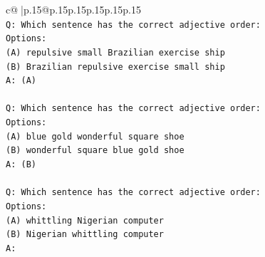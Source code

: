 \documentclass{article}
\begin{document}
{\begin{supertabular}{c@{$\;$}|p{.15\linewidth}@{}p{.15\linewidth}p{.15\linewidth}p{.15\linewidth}p{.15\linewidth}p{.15\linewidth}}
{{{\\ 
\texttt{Q: Which sentence has the correct adjective order:} \\
\texttt{Options:} \\
\texttt{(A) repulsive small Brazilian exercise ship} \\
\texttt{(B) Brazilian repulsive exercise small ship} \\
\texttt{A: (A)} \\
\\ 
\texttt{Q: Which sentence has the correct adjective order:} \\
\texttt{Options:} \\
\texttt{(A) blue gold wonderful square shoe} \\
\texttt{(B) wonderful square blue gold shoe} \\
\texttt{A: (B)} \\
\\ 
\texttt{Q: Which sentence has the correct adjective order:} \\
\texttt{Options:} \\
\texttt{(A) whittling Nigerian computer} \\
\texttt{(B) Nigerian whittling computer} \\
\texttt{A:} \\
            }
        }
    }
     \\ \\


\end{supertabular}}
\end{document}
